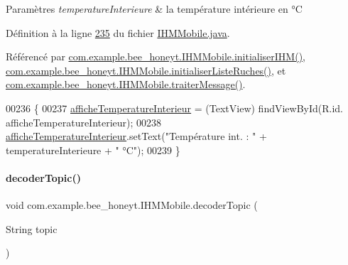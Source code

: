 \begin{DoxyParams}{Paramètres}
{\em temperature\+Interieure} & la température intérieure en °C \\
\hline
\end{DoxyParams}


Définition à la ligne \hyperlink{_i_h_m_mobile_8java_source_l00235}{235} du fichier \hyperlink{_i_h_m_mobile_8java_source}{I\+H\+M\+Mobile.\+java}.



Référencé par \hyperlink{_i_h_m_mobile_8java_source_l00152}{com.\+example.\+bee\+\_\+honeyt.\+I\+H\+M\+Mobile.\+initialiser\+I\+H\+M()}, \hyperlink{_i_h_m_mobile_8java_source_l00170}{com.\+example.\+bee\+\_\+honeyt.\+I\+H\+M\+Mobile.\+initialiser\+Liste\+Ruches()}, et \hyperlink{_i_h_m_mobile_8java_source_l00374}{com.\+example.\+bee\+\_\+honeyt.\+I\+H\+M\+Mobile.\+traiter\+Message()}.


\begin{DoxyCode}
00236     \{
00237         \hyperlink{classcom_1_1example_1_1bee__honeyt_1_1_i_h_m_mobile_ac553e3089f95a9fec9ec7345ad3aefcd}{afficheTemperatureInterieur} = (TextView) findViewById(R.id.
      afficheTemperatureInterieur);
00238         \hyperlink{classcom_1_1example_1_1bee__honeyt_1_1_i_h_m_mobile_ac553e3089f95a9fec9ec7345ad3aefcd}{afficheTemperatureInterieur}.setText(\textcolor{stringliteral}{"Température int. : "} + 
      temperatureInterieure + \textcolor{stringliteral}{" °C"});
00239     \}
\end{DoxyCode}
\mbox{\label{classcom_1_1example_1_1bee__honeyt_1_1_i_h_m_mobile_a7bc9099049f98bcc154c1e8d9f773133}} 
\paragraph{\texorpdfstring{decoder\+Topic()}{decoderTopic()}}
{\footnotesize\ttfamily void com.\+example.\+bee\+\_\+honeyt.\+I\+H\+M\+Mobile.\+decoder\+Topic (\begin{DoxyParamCaption}\item[{String}]{topic }\end{DoxyParamCaption})\hspace{0.3cm}{\ttfamily [private]}}

